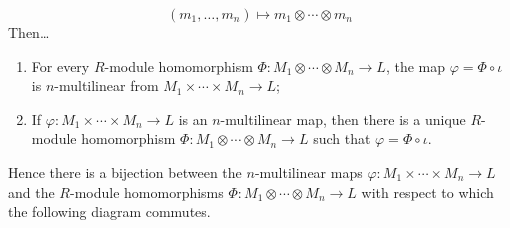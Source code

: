 \documentclass[../notes.tex]{subfiles}
\begin{document}
\begin{itemize}
\begin{corollary}
\begin{equation*}
            (m_1,\dots,m_n) \mapsto m_1\otimes\cdots\otimes m_n
        \end{equation*}
        Then\dots
        \begin{enumerate}
            \item For every $R$-module homomorphism $\Phi:M_1\otimes\cdots\otimes M_n\to L$, the map $\varphi=\Phi\circ\iota$ is $n$-multilinear from $M_1\times\cdots\times M_n\to L$;
            \item If $\varphi:M_1\times\cdots\times M_n\to L$ is an $n$-multilinear map, then there is a unique $R$-module homomorphism $\Phi:M_1\otimes\cdots\otimes M_n\to L$ such that $\varphi=\Phi\circ\iota$.
        \end{enumerate}
        Hence there is a bijection between the $n$-multilinear maps $\varphi:M_1\times\cdots\times M_n\to L$ and the $R$-module homomorphisms $\Phi:M_1\otimes\cdots\otimes M_n\to L$ with respect to which the following diagram commutes.
        \begin{figure}[H]
            \centering
\end{figure}
\end{corollary}
\end{itemize}
\end{document}
